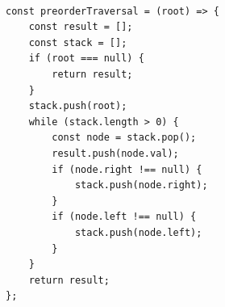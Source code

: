 \documentclass[11pt]{article}
\begin{document}
\begin{verbatim}

const preorderTraversal = (root) => {
    const result = [];
    const stack = [];
    if (root === null) {
        return result;
    }
    stack.push(root);
    while (stack.length > 0) {
        const node = stack.pop();
        result.push(node.val);
        if (node.right !== null) {
            stack.push(node.right);
        }
        if (node.left !== null) {
            stack.push(node.left);
        }
    }
    return result;
};

\end{verbatim}

\end{document}
